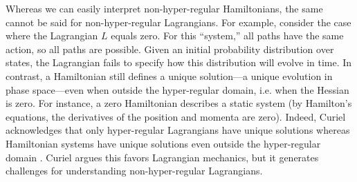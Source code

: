 \documentclass[12pt, english, twoside]{article} %
\begin{document}
Whereas we can easily interpret non-hyper-regular Hamiltonians, the same cannot be said for non-hyper-regular Lagrangians. For example, consider the case where the Lagrangian $L$ equals zero. For this ``system,'' all paths have the same action, so all paths are possible. Given an initial probability distribution over states, the Lagrangian fails to specify how this distribution will evolve in time. In contrast, a Hamiltonian still defines a unique solution---a unique evolution in phase space---even when outside the hyper-regular domain, i.e. when the Hessian is zero. For instance, a zero Hamiltonian describes a static system (by Hamilton's equations, the derivatives of the position and momenta are zero). Indeed, Curiel acknowledges that only hyper-regular Lagrangians have unique solutions whereas Hamiltonian systems have unique solutions even outside the hyper-regular domain \parencites*[291, 308]{Curiel}. Curiel argues this favors Lagrangian mechanics, but it generates challenges for understanding non-hyper-regular Lagrangians.
\end{document}
